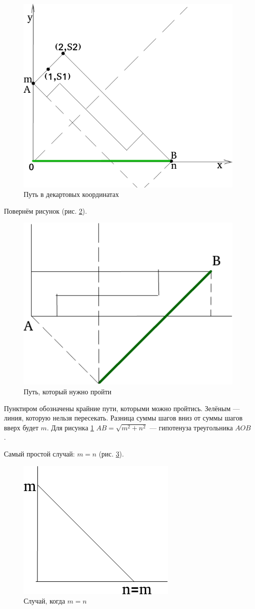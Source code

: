 \documentclass{book}
\begin{document}
\begin{figure}[h!]
  \centering
  \includegraphics[width=.6\textwidth]{./pictures/4_22_3.png}
  \caption{Путь в декартовых координатах}
  \label{fig:4223}
\end{figure}

Повернём рисунок (рис. \ref{fig:4224}).

\begin{figure}[h!]
  \centering
  \includegraphics[width=.6\textwidth]{./pictures/4_22_4.png}
  \caption{Путь, который нужно пройти}
  \label{fig:4224}
\end{figure}

Пунктиром обозначены крайние пути, которыми можно пройтись.
Зелёным --- линия, которую нельзя пересекать.
Разница суммы шагов вниз от суммы шагов вверх будет $m$.
Для рисунка \ref{fig:4223} $AB = \sqrt{m^2 + n^2}$ --- гипотенуза треугольника $AOB$.

Самый простой случай: $m = n$ (рис. \ref{fig:4225}).

\begin{figure}[h!]
  \centering
  \includegraphics[width=.6\textwidth]{./pictures/4_22_5.png}
  \caption{Случай, когда $m = n$}
  \label{fig:4225}
\end{figure}
\end{document}

